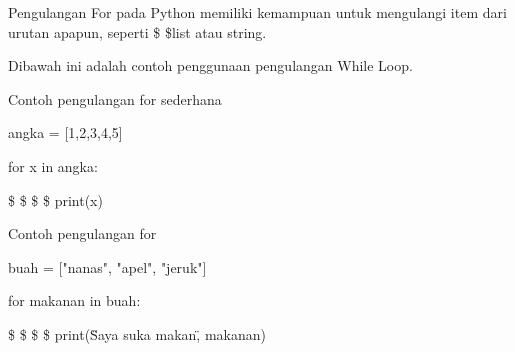 Pengulangan For pada Python memiliki kemampuan untuk mengulangi item dari urutan apapun, seperti \$  \$list atau string. \par
\vspace{\baselineskip}
\vspace{\baselineskip}
Dibawah ini adalah contoh penggunaan pengulangan While Loop. \par
\vspace{\baselineskip}
\vspace{12pt}
Contoh pengulangan for sederhana \par
\vspace{\baselineskip}
angka = [1,2,3,4,5] \par
\vspace{\baselineskip}
for x in angka: \par
\vspace{\baselineskip}
 \$  \$  \$  \$ print(x) \par
\vspace{\baselineskip}
\vspace{\baselineskip}
Contoh pengulangan for \par
\vspace{\baselineskip}
buah = ["nanas", "apel", "jeruk"] \par
\vspace{\baselineskip}
for makanan in buah: \par
\vspace{\baselineskip}
 \$  \$  \$  \$ print(\"Saya suka makan\", makanan) \par
\vspace{\baselineskip}
\vspace{\baselineskip}
\vspace{12pt}

